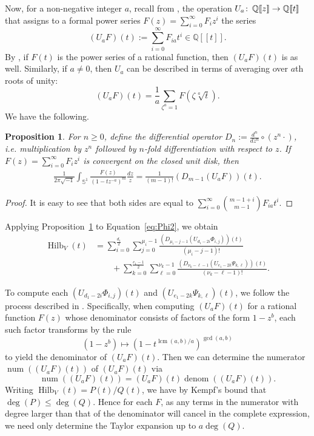 \documentclass{amsart}
\newtheorem{proposition}[theorem]{Proposition}
\theoremstyle{definition}
\theoremstyle{remark}
\newcommand{\Sp}{\mathbb{S}}
\newcommand{\Q}{\mathbb{Q}}
\newcommand{\lcm}{\operatorname{lcm}}
\newcommand{\co}{\colon\thinspace}
\newcommand{\Hilb}{\operatorname{Hilb}}
\begin{document}
Now, for a non-negative integer $a$, recall from \cite[Section 4]{HerbigSeaton}, \cite{Springer} the operation
$U_a\co \Q[\![z]\!]\to\Q[\![t]\!]$ that assigns to a formal power series $F(z) = \sum_{i=0}^\infty F_i z^i$
the series
\[
    (U_a F)(t) := \sum\limits_{i=0}^\infty F_{ia} t^i \in \Q[\![t]\!].
\]
By \cite[Lemma 4.1]{HerbigSeaton}, if $F(t)$ is the power series of a rational function, then $(U_a F)(t)$
is as well. Similarly, if $a\ne 0$, then $U_a$ can be described in terms of averaging over $a$th roots of unity:
\[
   (U_a F)(t) = \frac{1}{a}\sum\limits_{\zeta^a=1} F(\zeta \sqrt[a]{t} ).
\]
We have the following.

\begin{proposition}
\label{prop:UaFormula}
For $n\ge 0$, define the differential operator $D_n:=\frac{d^n}{dz^n}\circ (z^n\cdot)$, i.e.
multiplication by $z^n$ followed by $n$-fold differentiation with respect to $z$. If
$F(z) = \sum_{i=0}^\infty F_i z^i$ is convergent on the closed unit disk, then
\begin{align*}
    \frac{1}{2\pi \sqrt{-1}}
        \int_{\Sp^1}\frac{F(z)}{(1-tz^{-a})^m} \frac{dz}{z}
        =   \frac{1}{(m-1)!}\left(D_{m-1}(U_a F)\right)(t).
\end{align*}
\end{proposition}
\begin{proof}
It is easy to see that both sides are equal to $\sum_{i=0}^\infty \binom{m-1+i}{m-1} F_{ia} t^i$.
\end{proof}

Applying Proposition~\ref{prop:UaFormula} to Equation~\eqref{eq:Phi2}, we obtain
\begin{align}
\label{eq:finalformula}
    \Hilb_{V}(t)
        &=  \sum_{i=0}^{\frac{d_1}{2}} \sum_{j=0}^{\mu_i-1}
                \frac{\left (D_{\mu_i-j-1}\left( U_{d_1-2i} \Phi_{i,j}\right)\right)(t)}{(\mu_i-j-1)!}
    \\ \nonumber &\quad\quad
            + \sum_{k=0}^{\frac{e_1-1}{2}}\sum_{\ell=0}^{\nu_k-1}
                \frac{\left (D_{\nu_k-\ell-1}\left( U_{e_1-2k} \Psi_{k,\ell}\right)\right)(t)}{(\nu_k-\ell-1)!}.
\end{align}

To compute each $(U_{d_1-2i} \Phi_{i,j})(t)$ and $(U_{e_1-2k} \Psi_{k,\ell})(t)$, we follow the process described
in \cite[Section 4]{HerbigSeaton}. Specifically, when computing $(U_a F)(t)$ for a rational function $F(z)$ whose
denominator consists of factors of the form $1 - z^b$, each such factor transforms by the rule
\[
    (1 - z^b)   \longmapsto     (1 - t^{\lcm(a,b)/a} )^{\gcd(a,b)}
\]
to yield the denominator of $(U_a F)(t)$. Then we can determine the numerator
$\operatorname{num}((U_a F)(t))$ of $(U_a F)(t)$ via
\[
    \operatorname{num}((U_a F)(t))
    =   (U_a F)(t) \operatorname{denom}((U_a F)(t)).
\]
Writing $\Hilb_V(t) = P(t)/Q(t)$, we have by Kempf's bound \cite[Theorem 4.3]{KempfHRThrm}
that $\deg(P) \leq \deg(Q)$. Hence for each $F$, as any terms in the numerator with degree larger than
that of the denominator will cancel in the complete expression, we need only determine the Taylor expansion
up to $a\deg(Q)$.
\end{document}
